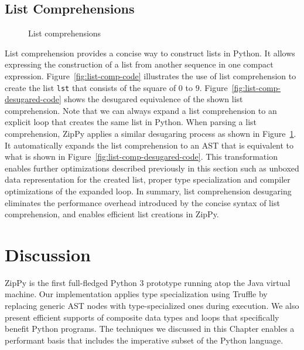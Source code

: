 \subsection{List Comprehensions}

\begin{figure}[h]
\centering
{}
\caption{List comprehensions}
\label{fig:list-comp}
\end{figure}

List comprehension provides a concise way to construct lists in Python.
It allows expressing the construction of a list from another sequence in one compact expression.
Figure~\ref{fig:list-comp-code} illustrates the use of list comprehension to create the list \texttt{lst} that consists of the square of $0$ to $9$.
Figure~\ref{fig:list-comp-desugared-code} shows the desugared equivalence of the shown list comprehension.
Note that we can always expand a list comprehension to an explicit loop that creates the same list in Python.
When parsing a list comprehension, ZipPy applies a similar desugaring process as shown in Figure~\ref{fig:list-comp}.
It automatically expands the list comprehension to an AST that is equivalent to what is shown in Figure~\ref{fig:list-comp-desugared-code}.
This transformation enables further optimizations described previously in this section such as unboxed data representation for the created list, proper type specialization and compiler optimizations of the expanded loop.
In summary, list comprehension desugaring eliminates the performance overhead introduced by the concise syntax of list comprehension, and enables efficient list creations in ZipPy.

\section{Discussion}
ZipPy is the first full-fledged Python 3 prototype running atop the Java virtual machine.
Our implementation applies type specialization using Truffle by replacing generic AST nodes with type-specialized ones during execution.
We also present efficient supports of composite data types and loops that specifically benefit Python programs.
The techniques we discussed in this Chapter enables a performant basis that includes the imperative subset of the Python language.
